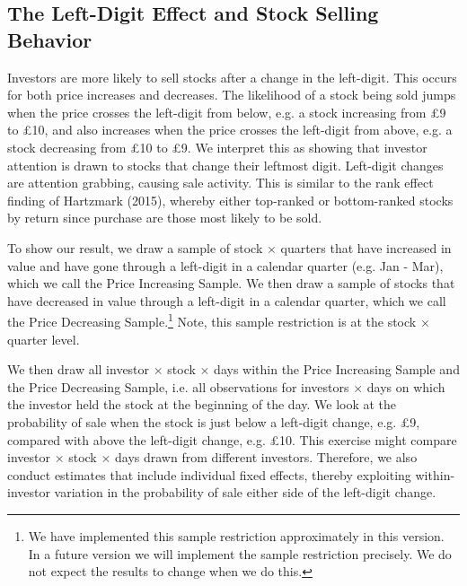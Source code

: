 \subsection*{The Left-Digit Effect and Stock Selling Behavior}

Investors are more likely to sell stocks after a change in the left-digit. This occurs for both price increases and decreases. The likelihood of a stock being sold jumps when the price crosses the left-digit from below, e.g. a stock increasing from \pounds9 to \pounds10, and also increases when the price crosses the left-digit from above, e.g. a stock decreasing from \pounds10 to \pounds9. We interpret this as showing that investor attention is drawn to stocks that change their leftmost digit. Left-digit changes are attention grabbing, causing sale activity. This is similar to the rank effect finding of Hartzmark (2015), whereby either top-ranked or bottom-ranked stocks by return since purchase are those most likely to be sold.

To show our result, we draw a sample of stock $\times$ quarters that have increased in value and have gone through a left-digit in a calendar quarter (e.g. Jan - Mar), which we call the Price Increasing Sample. We then draw a sample of stocks that have decreased in value through a left-digit in a calendar quarter, which we call the Price Decreasing Sample.\footnote{We have implemented this sample restriction approximately in this version. In a future version we will implement the sample restriction precisely. We do not expect the results to change when we do this.} Note, this sample restriction is at the stock $\times$ quarter level.

We then draw all investor $\times$ stock $\times$ days within the Price Increasing Sample and the Price Decreasing Sample, i.e. all observations for investors $\times$ days on which the investor held the stock at the beginning of the day. We look at the probability of sale when the stock is just below a left-digit change, e.g. \pounds9, compared with above the left-digit change, e.g. \pounds10. This exercise might compare investor $\times$ stock $\times$ days drawn from different investors. Therefore, we also conduct estimates that include individual fixed effects, thereby exploiting within-investor variation in the probability of sale either side of the left-digit change.

